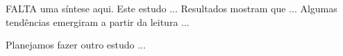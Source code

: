 FALTA uma síntese aqui. 
Este estudo ...
Resultados mostram que ...
Algumas tendências emergiram a partir da leitura ...

Planejamos fazer outro estudo ... 



%
%
%
%
%
%






